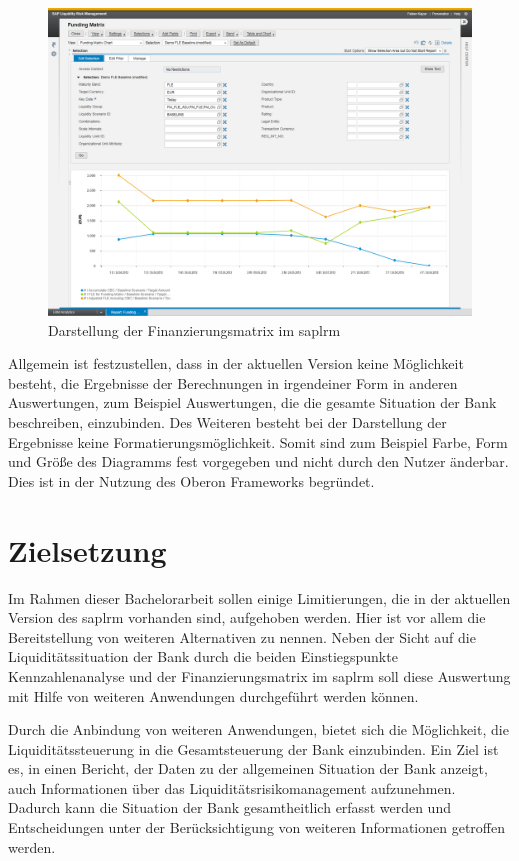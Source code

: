 \begin{onehalfspacing}
\begin{figure}[ht]
\centering
\setlength{\unitlength}{1mm}
\includegraphics[width=15cm]{images/Funding_Matrix_Example-crop.png}
\caption{Darstellung der Finanzierungsmatrix im \gls{saplrm}\label{fig:lrm_istzustand_fundingmatrix}}
\end{figure} 

Allgemein ist festzustellen, dass in der aktuellen Version keine Möglichkeit besteht, die Ergebnisse der Berechnungen in irgendeiner Form in anderen Auswertungen, zum Beispiel Auswertungen, die die gesamte Situation der Bank beschreiben, einzubinden. Des Weiteren besteht bei der Darstellung der Ergebnisse keine Formatierungsmöglichkeit. Somit sind zum Beispiel Farbe, Form und Größe des Diagramms fest vorgegeben und nicht durch den Nutzer änderbar. Dies ist in der Nutzung des Oberon Frameworks begründet.

\section{Zielsetzung}
\label{sec:zielsetzung}

Im Rahmen dieser Bachelorarbeit sollen einige Limitierungen, die in der aktuellen Version des \gls{saplrm} vorhanden sind, aufgehoben werden. Hier ist vor allem die Bereitstellung von weiteren Alternativen zu nennen. Neben der Sicht auf die Liquiditätssituation der Bank durch die beiden Einstiegspunkte Kennzahlenanalyse und der Finanzierungsmatrix im \gls{saplrm} soll diese Auswertung mit Hilfe von weiteren Anwendungen durchgeführt werden können.

Durch die Anbindung von weiteren Anwendungen, bietet sich die Möglichkeit, die Liquiditätssteuerung in die Gesamtsteuerung der Bank einzubinden. Ein Ziel ist es, in einen Bericht, der Daten zu der allgemeinen Situation der Bank anzeigt, auch Informationen über das Liquiditätsrisikomanagement aufzunehmen. Dadurch kann die Situation der Bank gesamtheitlich erfasst werden und Entscheidungen unter der Berücksichtigung von weiteren Informationen getroffen werden.


\end{onehalfspacing}
